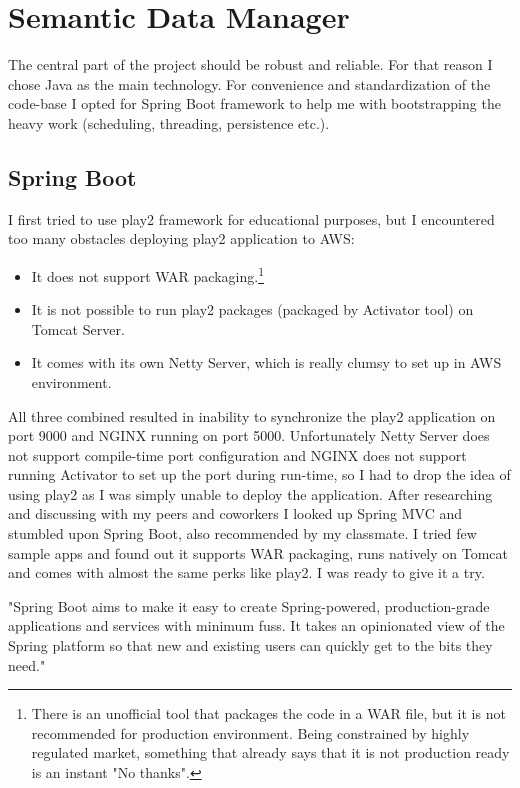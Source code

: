 \section{Semantic Data Manager}
The central part of the project should be robust and reliable. For that reason I chose Java as the main technology. For convenience and standardization of the code-base I opted for Spring Boot framework to help me with bootstrapping the heavy work (scheduling, threading, persistence etc.).

\subsection{Spring Boot}

I first tried to use play2 framework for educational purposes, but I encountered too many obstacles deploying play2 application to AWS: 

\begin{itemize}
	\item It does not support WAR packaging.\footnote{There is an unofficial tool that packages the code in a WAR file, but it is not recommended for production environment. Being constrained by highly regulated market, something that already says that it is not production ready is an instant "No thanks".}
	\item It is not possible to run play2 packages (packaged by Activator tool) on Tomcat Server.
	\item It comes with its own Netty Server, which is really clumsy to set up in AWS environment.
\end{itemize}

All three combined resulted in inability to synchronize the play2 application on port 9000 and NGINX running on port 5000. Unfortunately Netty Server does not support compile-time port configuration and NGINX does not support running Activator to set up the port during run-time, so I had to drop the idea of using play2 as I was simply unable to deploy the application. After researching and discussing with my peers and coworkers I looked up Spring MVC and stumbled upon Spring Boot, also recommended by my classmate. I tried few sample apps and found out it supports WAR packaging, runs natively on Tomcat and comes with almost the same perks like play2. I was ready to give it a try.

"Spring Boot aims to make it easy to create Spring-powered, production-grade applications and services with minimum fuss. It takes an opinionated view of the Spring platform so that new and existing users can quickly get to the bits they need."\cite{spring-boot-blog}

